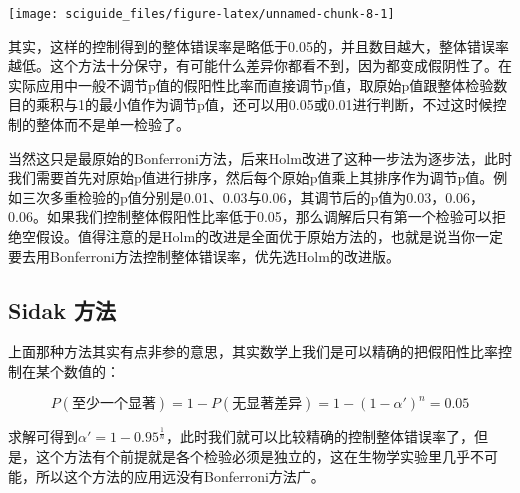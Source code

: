 \documentclass[]{tufte-book}
\newenvironment{Shaded}{}{}
\newcommand{\CommentTok}[1]{\textcolor[rgb]{0.38,0.63,0.69}{\textit{#1}}}
\newcommand{\DataTypeTok}[1]{\textcolor[rgb]{0.56,0.13,0.00}{#1}}
\newcommand{\DecValTok}[1]{\textcolor[rgb]{0.25,0.63,0.44}{#1}}
\newcommand{\FloatTok}[1]{\textcolor[rgb]{0.25,0.63,0.44}{#1}}
\newcommand{\KeywordTok}[1]{\textcolor[rgb]{0.00,0.44,0.13}{\textbf{#1}}}
\newcommand{\NormalTok}[1]{#1}
\newcommand{\OperatorTok}[1]{\textcolor[rgb]{0.40,0.40,0.40}{#1}}
\newcommand{\StringTok}[1]{\textcolor[rgb]{0.25,0.44,0.63}{#1}}
\begin{document}
\begin{Shaded}
\end{Shaded}

\texttt{[image: sciguide\_files/figure-latex/unnamed-chunk-8-1]}

其实，这样的控制得到的整体错误率是略低于0.05的，并且数目越大，整体错误率越低。这个方法十分保守，有可能什么差异你都看不到，因为都变成假阴性了。在实际应用中一般不调节p值的假阳性比率而直接调节p值，取原始p值跟整体检验数目的乘积与1的最小值作为调节p值，还可以用0.05或0.01进行判断，不过这时候控制的整体而不是单一检验了。

当然这只是最原始的Bonferroni方法，后来Holm改进了这种一步法为逐步法，此时我们需要首先对原始p值进行排序，然后每个原始p值乘上其排序作为调节p值。例如三次多重检验的p值分别是0.01、0.03与0.06，其调节后的p值为0.03，0.06，0.06。如果我们控制整体假阳性比率低于0.05，那么调解后只有第一个检验可以拒绝空假设。值得注意的是Holm的改进是全面优于原始方法的，也就是说当你一定要去用Bonferroni方法控制整体错误率，优先选Holm的改进版。

\hypertarget{sidak-ux65b9ux6cd5}{%
\subsection{Sidak 方法}\label{sidak-ux65b9ux6cd5}}

上面那种方法其实有点非参的意思，其实数学上我们是可以精确的把假阳性比率控制在某个数值的：

\[
P(至少一个显著)=1-P(无显著差异) = 1-(1-\alpha')^n = 0.05
\]

求解可得到\(\alpha' = 1-0.95^{\frac{1}{n}}\)，此时我们就可以比较精确的控制整体错误率了，但是，这个方法有个前提就是各个检验必须是独立的，这在生物学实验里几乎不可能，所以这个方法的应用远没有Bonferroni方法广。
\end{document}

